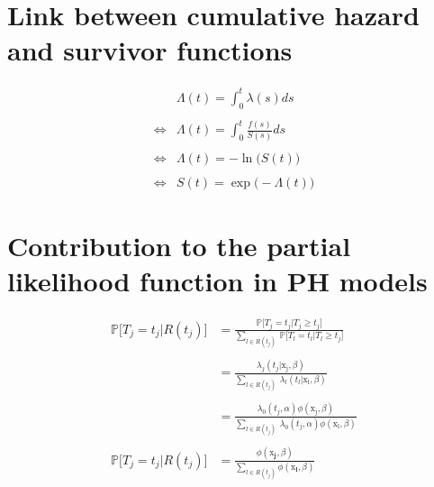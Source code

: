 \documentclass[
]{book}
\begin{document}
\hypertarget{link-between-cumulative-hazard-and-survivor-functions}{%
\section*{Link between cumulative hazard and survivor functions}\label{link-between-cumulative-hazard-and-survivor-functions}}

\begin{equation}
  \begin{aligned}
       & \Lambda(t) = \int_{0}^{t} \lambda(s)ds \\\\
  \iff & \Lambda(t) = \int_{0}^{t} \frac{f(s)}{S(s)}ds \\\\
  \iff & \Lambda(t) = -\ln \big(S(t)\big) \\\\
  \iff & S(t) = \exp \big(-\Lambda(t)\big)
  \end{aligned}
  \label{eq:linksurvcumhaz}
\end{equation}

\hypertarget{contribution-to-the-partial-likelihood-function-in-ph-models}{%
\section*{Contribution to the partial likelihood function in PH models}\label{contribution-to-the-partial-likelihood-function-in-ph-models}}

\begin{equation}
\begin{aligned}
  \mathbb{P}\big[T_j = t_j | R(t_j) \big] & = \frac{\mathbb{P}\big[T_j = t_j | T_j \geq t_j \big]}{\sum_{l \in R(t_j)} \ \mathbb{P}\big[T_l = t_l | T_l \geq t_j \big]} \\\\
  & = \frac{\lambda_j(t_j|\pmb{\mathrm{x_j}}, \beta)}{\sum_{l \in R(t_j)} \ \lambda_l(t_l|\pmb{\mathrm{x_l}}, \beta)} \\\\
  & = \frac{\lambda_0 (t_j, \alpha)\phi(\pmb{\mathrm{x_j}}, \beta)}{\sum_{l \in R(t_j)} \ \lambda_0 (t_j, \alpha)\phi(\pmb{\mathrm{x_l}}, \beta)} \\\\
  \mathbb{P}\big[T_j = t_j | R(t_j) \big] & = \frac{\phi(\pmb{\mathrm{x}_j}, \beta)}{\sum_{l \in R(t_j)} \phi(\pmb{\mathrm{x}_l}, \beta)}
\end{aligned}
\label{eq:contribpartiallikproof}
\end{equation}
\end{document}

